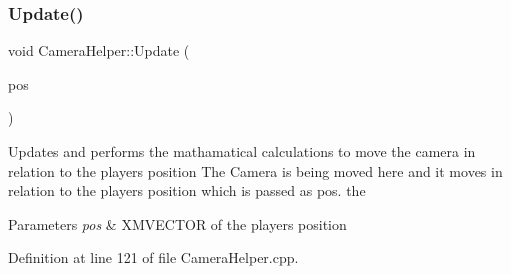 \mbox{\label{class_camera_helper_a0b9c762c778086dd01d90a25b7ea2989}} 
\subsubsection{\texorpdfstring{Update()}{Update()}}
{\footnotesize\ttfamily void Camera\+Helper\+::\+Update (\begin{DoxyParamCaption}\item[{X\+M\+V\+E\+C\+T\+OR $\ast$}]{pos }\end{DoxyParamCaption})}

Updates and performs the mathamatical calculations to move the camera in relation to the players position The Camera is being moved here and it moves in relation to the players position which is passed as pos. the 
\begin{DoxyParams}{Parameters}
{\em pos} & X\+M\+V\+E\+C\+T\+OR of the players position \\
\hline
\end{DoxyParams}


Definition at line 121 of file Camera\+Helper.\+cpp.


